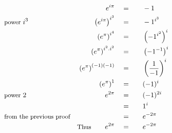 \begin{alignat*}{5}
&\,&e^{i\pi}\quad&=\quad&&-1\\
&\small\text{power }i^3&\left(e^{i\pi}\right)^{i^3}\quad&=&&-1^{i^3}\\
&\,&\left(e^\pi\right)^{i^4}\quad&=&&\left(-1^{i^2}\right)^i\\
&\,&\left(e^\pi\right)^{i^2.i^2}\quad&=&&\left(-1^{-1}\right)^i\\
&\,&\left(e^\pi\right)^{(-1)(-1)}\quad&=&&\left(\frac{1}{-1}\right)^i\\
&\,&\left(e^\pi\right)^1\quad&=&&(-1)^i\\
&\small\text{power }2&e^{2\pi}\quad&=&&(-1)^{2i}\\
&\,&\,&=&&1^i\\
&\small\text{from the previous proof}&\,&=&&e^{-2\pi}\\
&\,&\small\text{Thus}\normalsize\qquad e^{2\pi}\quad&=&&e^{-2\pi}
\end{alignat*}

